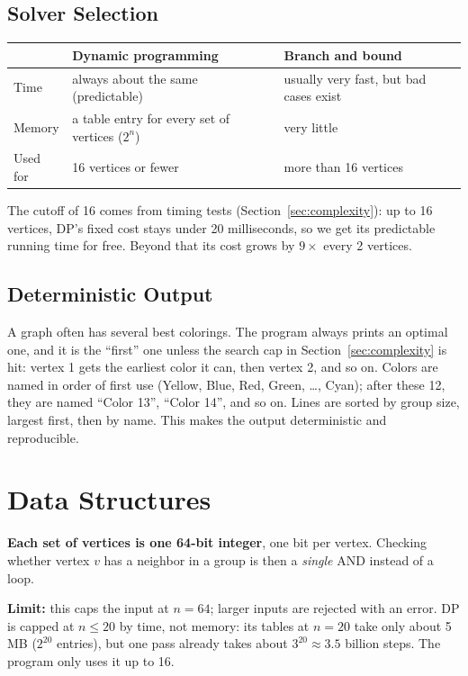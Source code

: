 \documentclass[11pt]{article}
\begin{document}
\subsection{Solver Selection}
\begin{tabular}{@{}lll@{}}
\toprule
 & Dynamic programming & Branch and bound \\
\midrule
Time & always about the same (predictable) & usually very fast, but bad cases exist \\
Memory & a table entry for every set of vertices ($2^n$) & very little \\
Used for & 16 vertices or fewer & more than 16 vertices \\
\bottomrule
\end{tabular}

The cutoff of 16 comes from timing tests (Section~\ref{sec:complexity}):
up to 16 vertices, DP's fixed cost stays under 20 milliseconds, so we get
its predictable running time for free. Beyond that its cost grows by
$9\times$ every 2 vertices.

\subsection{Deterministic Output}
A graph often has several best colorings. The program always prints an
optimal one, and it is the ``first'' one unless the search cap in
Section~\ref{sec:complexity} is hit: vertex 1 gets the earliest color it
can, then vertex 2, and so on. Colors are named in order of first use
(Yellow, Blue, Red, Green, \dots, Cyan); after these 12, they are named
``Color 13'', ``Color 14'', and so on. Lines are sorted by group size,
largest first, then by name. This makes the output deterministic and
reproducible.

\section{Data Structures}

\textbf{Each set of vertices is one 64-bit integer}, one bit per vertex.
Checking whether vertex $v$ has a neighbor in a group is then a
\emph{single} AND instead of a loop.

\textbf{Limit:} this caps the input at $n = 64$; larger inputs are rejected
with an error. DP is capped at $n \le 20$ by time, not memory: its tables
at $n=20$ take only about 5\,MB ($2^{20}$ entries), but one pass already
takes about $3^{20} \approx 3.5$ billion steps. The program only uses it up
to 16.
\end{document}
